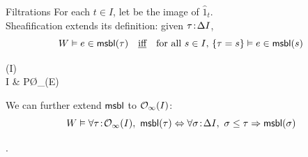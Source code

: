 

\begin{frame}{Filtrations}
	For each $t \in I$, let  be the image of $\hat 1_t$.\\[1ex]
	Sheafification extends its definition: given $\tau \!:\! \Delta I$,
	\begin{equation*}
		W \vDash e \in \mathsf{msbl}(\tau) \quad\text{\underline{iff}}\quad \text{for all $s \in I$, $\{\tau = s\} \vDash e \in \mathsf{msbl}(s)$}
	\end{equation*}

	\vfill
	\begin{diagram*}
		(I)  \\
		\Delta I  \& P\O_\infty(E)
	\end{diagram*}

	\vfill
	We can further extend $\mathsf{msbl}$ to $\mathcal{O}_\infty(I)$:
	\begin{equation*}
		W \forces \forall \tau \tin \O_\infty(I),\ \msbl(\tau) \Leftrightarrow \forall \sigma \tin \Delta I,\ \sigma \leq \tau \hey \msbl(\sigma)
	\end{equation*}

	\vfill
	.
\end{frame}

